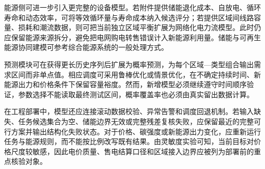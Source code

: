 能源侧可进一步引入更完整的设备模型。若附件提供储能退化成本、自放电、循环寿命和动态效率，可将等效循环量与寿命成本纳入候选评分；若提供区域间线路容量、损耗和潮流数据，则可把当前独立区域平衡扩展为网络化电力流模型。此时仍应保留能源来源拆分，避免把电网购电转售错误计入新能源利用量。储能与可再生能源协同建模可参考综合能源系统的一般处理方式\cite{lindenberger2017energy}。

预测模块可在获得更长历史序列后扩展为概率预测，为每个区域—类型组合输出需求区间而非单点值。相应调度可采用鲁棒优化或情景优化，在不确定持续时间、新能源出力和价格条件下保留容量裕度。然而，新增模型必须继续遵守时间顺序验证，参数选择不能读取最终测试区间，概率覆盖率也必须由真实留出数据计算。

在工程部署中，模型还应连接滚动数据校验、异常告警和调度回退机制。若输入缺失、任务候选集合为空、储能边界无效或完整残差复核失败，应保留最近的完整可行方案并输出结构化失败状态。对于价格、碳强度或新能源出力变化，应重新运行任务与能源规则，而不能按比例改写既有结果。由灵敏度实验可知，当前目标对价格尺度较敏感，因此电价质量、售电结算口径和区域接入边界应被列为部署前的重点核验对象。
